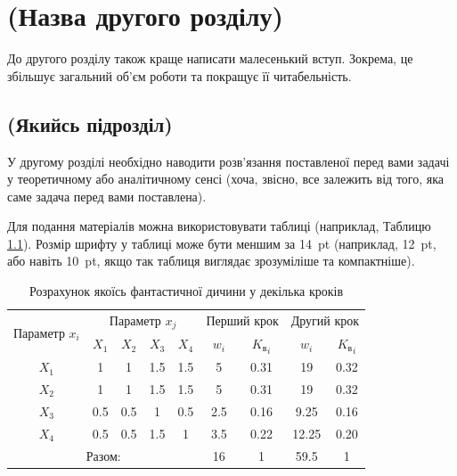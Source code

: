 \chapter{(Назва другого розділу)}
\label{chap:theory}

До другого розділу також краще написати малесенький вступ. Зокрема, це
збільшує загальний об'єм роботи та покращує її читабельність.

\section{(Якийсь підрозділ)}

У другому розділі необхідно наводити розв'язання поставленої перед вами
задачі у теоретичному або аналітичному сенсі (хоча, звісно, все залежить
від того, яка саме задача перед вами поставлена).

Для подання матеріалів можна використовувати таблиці (наприклад,
Таблицю \ref{tab_weight}). Розмір шрифту у таблиці може бути меншим за 14~pt (наприклад, 12~pt, або навіть 10~pt, якщо так таблиця виглядає зрозуміліше та компактніше).

\begin{table}[ht]
    \setfontsize{14pt}
    \caption{Розрахунок якоїсь фантастичної дичини у декілька кроків}
    \label{tab_weight}
    \centering
    \begin{tabular}{|c|c|c|c|c|c|c|c|c|}
        \hline \multirow{2}{*}{Параметр $x_i$} & \multicolumn{4}{c|}{Параметр $x_j$} &
        \multicolumn{2}{c|}{Перший крок}       & \multicolumn{2}{c|}{Другий крок}                                                                     \\
        \cline{2-9}                            & $X_1$                               & $X_2$            & $X_3$ & $X_4$ & $w_i$ &
        ${K_\text{в}}_i$                       & $w_i$                               & ${K_\text{в}}_i$                                               \\
        \hline $X_1$                           & 1                                   & 1                & 1.5   & 1.5   & 5     & 0.31 & 19    & 0.32 \\
        \hline $X_2$                           & 1                                   & 1                & 1.5   & 1.5   & 5     & 0.31 & 19    & 0.32 \\
        \hline $X_3$                           & 0.5                                 & 0.5              & 1     & 0.5   & 2.5   & 0.16 & 9.25  & 0.16 \\
        \hline $X_4$                           & 0.5                                 & 0.5              & 1.5   & 1     & 3.5   & 0.22 & 12.25 & 0.20 \\
        \hline \multicolumn{5}{|c|}{Разом:}    & 16                                  & 1                & 59.5  & 1                                   \\
        \hline
    \end{tabular}
\end{table}

